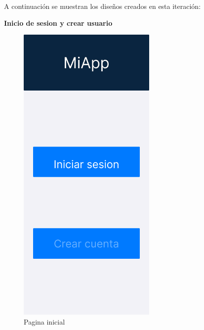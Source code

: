 A continuación se muestran los diseños creados en esta iteración:

\textbf{Inicio de sesion y crear usuario}

\begin{figure}[H]
   \centering
    \includegraphics[width=0.6\textwidth]{fotos/Frame 22.png}
    \caption{Pagina inicial}
    \label{fig:Pagina inicial}
\end{figure}
